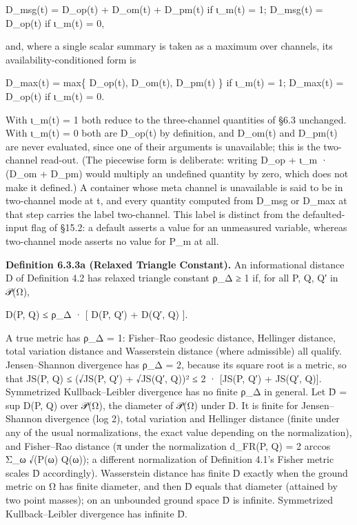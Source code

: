 \documentclass[
]{article}
\begin{document}
D\_msg(t) = D\_op(t) + D\_om(t) + D\_pm(t) if ι\_m(t) = 1; D\_msg(t) =
D\_op(t) if ι\_m(t) = 0,

and, where a single scalar summary is taken as a maximum over channels,
its availability-conditioned form is

D\_max(t) = max\{ D\_op(t), D\_om(t), D\_pm(t) \} if ι\_m(t) = 1;
D\_max(t) = D\_op(t) if ι\_m(t) = 0.

With ι\_m(t) = 1 both reduce to the three-channel quantities of §6.3
unchanged. With ι\_m(t) = 0 both are D\_op(t) by definition, and
D\_om(t) and D\_pm(t) are never evaluated, since one of their arguments
is unavailable; this is the two-channel read-out. (The piecewise form is
deliberate: writing D\_op + ι\_m · (D\_om + D\_pm) would multiply an
undefined quantity by zero, which does not make it defined.) A container
whose meta channel is unavailable is said to be in two-channel mode at
t, and every quantity computed from D\_msg or D\_max at that step
carries the label two-channel. This label is distinct from the
defaulted-input flag of §15.2: a default asserts a value for an
unmeasured variable, whereas two-channel mode asserts no value for P\_m
at all.

\textbf{Definition 6.3.3a (Relaxed Triangle Constant).} An informational
distance D of Definition 4.2 has relaxed triangle constant ρ\_Δ ≥ 1 if,
for all P, Q, Q′ in 𝒫(Ω),

D(P, Q) ≤ ρ\_Δ · {[} D(P, Q′) + D(Q′, Q) {]}.

A true metric has ρ\_Δ = 1: Fisher--Rao geodesic distance, Hellinger
distance, total variation distance and Wasserstein distance (where
admissible) all qualify. Jensen--Shannon divergence has ρ\_Δ = 2,
because its square root is a metric, so that JS(P, Q) ≤ (√JS(P, Q′) +
√JS(Q′, Q))² ≤ 2 · {[}JS(P, Q′) + JS(Q′, Q){]}. Symmetrized
Kullback--Leibler divergence has no finite ρ\_Δ in general. Let D̄ = sup
D(P, Q) over 𝒫(Ω), the diameter of 𝒫(Ω) under D. It is finite for
Jensen--Shannon divergence (log 2), total variation and Hellinger
distance (finite under any of the usual normalizations, the exact value
depending on the normalization), and Fisher--Rao distance (π under the
normalization d\_FR(P, Q) = 2 arccos Σ\_ω √(P(ω) Q(ω)); a different
normalization of Definition 4.1's Fisher metric scales D̄ accordingly).
Wasserstein distance has finite D̄ exactly when the ground metric on Ω
has finite diameter, and then D̄ equals that diameter (attained by two
point masses); on an unbounded ground space D̄ is infinite. Symmetrized
Kullback--Leibler divergence has infinite D̄.
\end{document}
